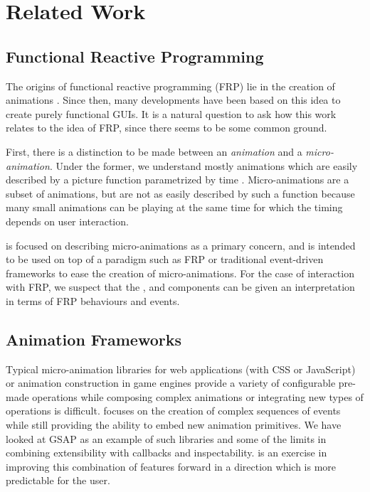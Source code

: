 \section{Related Work}
\label{sec:related}

\subsection{Functional Reactive Programming}
The origins of functional reactive programming (FRP) lie in the creation of animations \cite{DBLP:conf/icfp/ElliottH97}. Since then, many developments have been based on this idea to create purely functional GUIs. It is a natural question to ask how this work relates to the idea of FRP, since there seems to be some common ground.

First, there is a distinction to be made between an \emph{animation} and a \emph{micro-animation}. Under the former, we understand mostly animations which are easily described by a picture function parametrized by time . Micro-animations are a subset of animations, but are not as easily described by such a function because many small animations can be playing at the same time for which the timing depends on user interaction.

\dsl{} is focused on describing micro-animations as a primary concern, and is intended to be used on top of a paradigm such as FRP or traditional event-driven frameworks to ease the creation of micro-animations. For the case of interaction with FRP, we suspect that the ,  and  components can be given an interpretation in terms of FRP behaviours and events.

\subsection{Animation Frameworks}

Typical micro-animation libraries for web applications (with CSS or JavaScript) or animation construction in game engines provide a variety of configurable pre-made operations while composing complex animations or integrating new types of operations is difficult. \dsl{} focuses on the creation of complex sequences of events while still providing the ability to embed new animation primitives. We have looked at GSAP as an example of such libraries and some of the limits in combining extensibility with callbacks and inspectability. \dsl{} is an exercise in improving this combination of features forward in a direction which is more predictable for the user.

